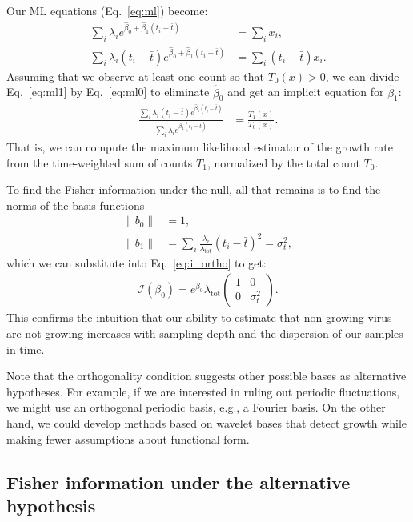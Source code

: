 \documentclass[12pt, letterpaper]{article}
\newcommand{ \lambtot }{\lambda_{\text{tot}}}
\begin{document}
Our ML equations (Eq.~\ref{eq:ml}) become:
\begin{align}
    \sum_i \lambda_i e^{\hat{\beta}_0 + \hat{\beta}_1 (t_i - \bar{t})} &= \sum_i x_i, \label{eq:ml0} \\
    \sum_i \lambda_i (t_i - \bar{t}) e^{\hat{\beta}_0 + \hat{\beta}_1 (t_i - \bar{t})} &= \sum_i (t_i - \bar{t}) x_i. \label{eq:ml1}
\end{align}
Assuming that we observe at least one count so that $T_0(x) > 0$, we can divide Eq.~\ref{eq:ml1} by Eq.~\ref{eq:ml0} to eliminate $\hat{\beta}_0$ and get an implicit equation for $\hat{\beta}_1$:
\begin{align}
    \frac{\sum_i \lambda_i (t_i - \bar{t}) e^{\hat{\beta}_1 (t_i - \bar{t})}}{\sum_i \lambda_i e^{\hat{\beta}_1 (t_i - \bar{t})}}
    &= \frac{T_1(x)}{T_0(x)}.
    \label{eq:ml_ratio}
\end{align}
That is, we can compute the maximum likelihood estimator of the growth rate from the time-weighted sum of counts $T_1$, normalized by the total count $T_0$.

To find the Fisher information under the null, all that remains is to find the norms of the basis functions
\begin{align}
    \|b_0\| &= 1, \\
    \|b_1\| &= \sum_i \frac{\lambda_i}{\lambtot} {(t_i - \bar{t})}^2 = \sigma_t^2,
\end{align}
which  we can substitute into Eq.~\ref{eq:i_ortho} to get:
\begin{align}
    \mathcal{I}(\beta_0) = e^{\beta_0} \lambtot
    \begin{pmatrix}
        1 & 0 \\
        0 & \sigma_t^2
    \end{pmatrix}.
\end{align}
This confirms the intuition that our ability to estimate that non-growing virus are not growing increases with sampling depth and the dispersion of our samples in time.

Note that the orthogonality condition suggests other possible bases as alternative hypotheses.
For example, if we are interested in ruling out periodic fluctuations, we might use an orthogonal periodic basis, e.g., a Fourier basis.
On the other hand, we could develop methods based on wavelet bases that detect growth while making fewer assumptions about functional form.

\subsection{Fisher information under the alternative hypothesis}
\end{document}
